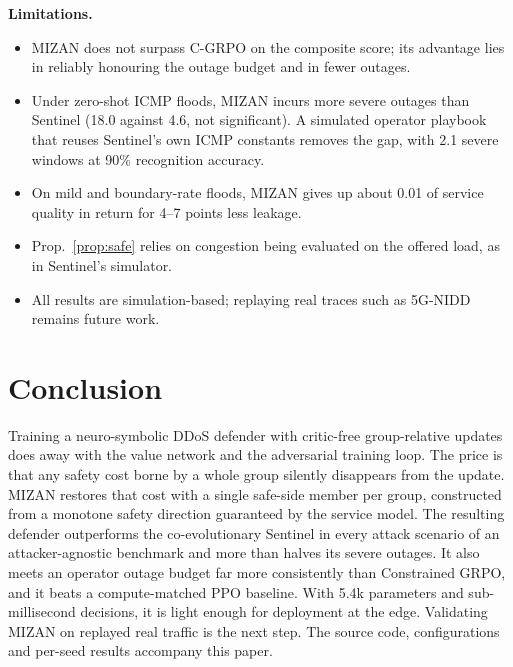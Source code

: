 \documentclass[conference]{IEEEtran}
\begin{document}
\textbf{Limitations.}
\begin{itemize}
\item MIZAN does not surpass C-GRPO on the composite score; its advantage lies in reliably honouring the outage budget and in fewer outages.
\item Under zero-shot ICMP floods, MIZAN incurs more severe outages than Sentinel (18.0 against 4.6, not significant). A simulated operator playbook that reuses Sentinel's own ICMP constants removes the gap, with 2.1 severe windows at 90\% recognition accuracy.
\item On mild and boundary-rate floods, MIZAN gives up about 0.01 of service quality in return for 4--7 points less leakage.
\item Prop.~\ref{prop:safe} relies on congestion being evaluated on the offered load, as in Sentinel's simulator.
\item All results are simulation-based; replaying real traces such as 5G-NIDD remains future work.
\end{itemize}

\section{Conclusion}
Training a neuro-symbolic DDoS defender with critic-free group-relative updates does away with the value network and the adversarial training loop. The price is that any safety cost borne by a whole group silently disappears from the update. MIZAN restores that cost with a single safe-side member per group, constructed from a monotone safety direction guaranteed by the service model. The resulting defender outperforms the co-evolutionary Sentinel in every attack scenario of an attacker-agnostic benchmark and more than halves its severe outages. It also meets an operator outage budget far more consistently than Constrained GRPO, and it beats a compute-matched PPO baseline. With 5.4k parameters and sub-millisecond decisions, it is light enough for deployment at the edge. Validating MIZAN on replayed real traffic is the next step. The source code, configurations and per-seed results accompany this paper.



\end{document}
